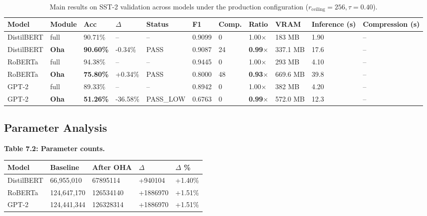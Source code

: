 \begin{table}[t]
\centering
\small
\begin{tabular}{lllllllllll}
\toprule
\textbf{Model} & \textbf{Module} & \textbf{Acc} & \textbf{$\Delta$} & \textbf{Status} & \textbf{F1} & \textbf{Comp.} & \textbf{Ratio} & \textbf{VRAM} & \textbf{Inference (s)} & \textbf{Compression (s)} \\
\midrule
DistilBERT & full & 90.71\% & -- & -- & 0.9099 & 0 & 1.00$\times$ & 183 MB & 1.90 & -- \\
DistilBERT & \textbf{Oha} & \textbf{90.60\%} & -0.34\% & PASS & 0.9087 & 24 & \textbf{0.99$\times$} & 337.1 MB & 17.6 & -- \\
RoBERTa & full & 94.38\% & -- & -- & 0.9445 & 0 & 1.00$\times$ & 293 MB & 4.10 & -- \\
RoBERTa & \textbf{Oha} & \textbf{75.80\%} & +0.34\% & PASS & 0.8000 & 48 & \textbf{0.93$\times$} & 669.6 MB & 39.8 & -- \\
GPT-2 & full & 89.33\% & -- & -- & 0.8942 & 0 & 1.00$\times$ & 382 MB & 4.20 & -- \\
GPT-2 & \textbf{Oha} & \textbf{51.26\%} & -36.58\% & PASS_LOW & 0.6763 & 0 & \textbf{0.99$\times$} & 572.0 MB & 12.3 & -- \\
\bottomrule
\end{tabular}
\caption{Main results on SST-2 validation across models under the production configuration ($r_{\mathrm{ceiling}}=256, \tau=0.40$).}
\label{tab:main_sst2}
\end{table}

\subsection{Parameter Analysis}

\textbf{Table 7.2: Parameter counts.}

\begin{table}[H]
\centering
\small
\begin{tabular}{lllll}
\toprule
\textbf{Model} & \textbf{Baseline} & \textbf{After OHA} & \textbf{$\Delta$} & \textbf{$\Delta$ \%} \\
\midrule
DistilBERT & 66,955,010 & 67895114 & +940104 & +1.40\% \\
RoBERTa & 124,647,170 & 126534140 & +1886970 & +1.51\% \\
GPT-2 & 124,441,344 & 126328314 & +1886970 & +1.51\% \\
\bottomrule
\end{tabular}
\end{table}

